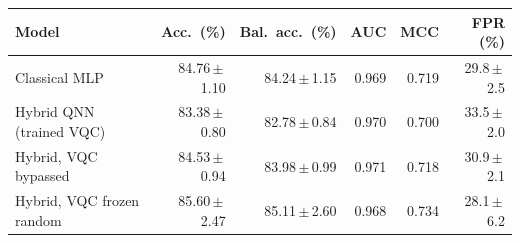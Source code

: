 \begin{tabular}{lrrrrr}
\toprule
Model & Acc.\ (\%) & Bal.\ acc.\ (\%) & AUC & MCC & FPR (\%) \\
\midrule
Classical MLP & 84.76\,$\pm$\,1.10 & 84.24\,$\pm$\,1.15 & 0.969 & 0.719 & 29.8\,$\pm$\,2.5 \\
Hybrid QNN (trained VQC) & 83.38\,$\pm$\,0.80 & 82.78\,$\pm$\,0.84 & 0.970 & 0.700 & 33.5\,$\pm$\,2.0 \\
Hybrid, VQC bypassed & 84.53\,$\pm$\,0.94 & 83.98\,$\pm$\,0.99 & 0.971 & 0.718 & 30.9\,$\pm$\,2.1 \\
Hybrid, VQC frozen random & 85.60\,$\pm$\,2.47 & 85.11\,$\pm$\,2.60 & 0.968 & 0.734 & 28.1\,$\pm$\,6.2 \\
\bottomrule
\end{tabular}
